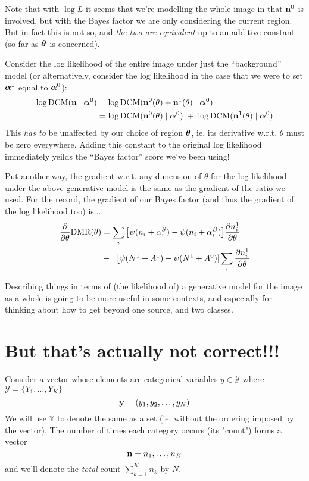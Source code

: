 \documentclass[12pt]{article}
\begin{document}
Note that with $\log L$ it seems that we're modelling the whole image
in that $\mathbf{n}^0$ is involved, but with the Bayes factor we are only
considering the current region. But in fact this is not so, and {\it
  the two are equivalent} up to an additive constant (so far as
$\boldsymbol\theta$ is concerned).

Consider the log likelihood of the entire image under just the
``background'' model (or alternatively, consider the log likelihood in the case that we were to set $\boldsymbol\alpha^1$ equal to $\boldsymbol\alpha^0$):
\begin{align*}
\log \mbox{DCM}(\mathbf{n} \mid \boldsymbol\alpha^0) 
&= \log \mbox{DCM}(\mathbf{n}^0(\theta) + \mathbf{n}^1(\theta) \mid \boldsymbol\alpha^0)  \\
&= \log \mbox{DCM}(\mathbf{n}^0(\theta) \mid \boldsymbol\alpha^0) \; + \; \log \mbox{DCM}(\mathbf{n}^1(\theta) \mid \boldsymbol\alpha^0) 
\end{align*}
This \emph{has to} be unaffected by our choice of region $\boldsymbol\theta$,
ie. its derivative w.r.t. $\theta$ must be zero everywhere.  Adding
this constant to the original log likelihood immediately yeilds the
``Bayes factor'' score we've been using!

Put another way, the gradient w.r.t. any dimension of $\theta$ for the
log likelihood under the above generative model is the same as the
gradient of the ratio we used.  For the record, the gradient of our
Bayes factor (and thus the gradient of the log likelihood too) is...
\begin{align}
\frac{\partial}{\partial\theta}\text{DMR}(\theta) 
&= \sum_i \big[ \psi(n_i + \alpha^S_i) - \psi(n_i + \alpha^B_i) \big] \frac{\partial n^1_i}{\partial\theta} \notag\\
& - \;\; \big[\psi(N^1+A^1) - \psi(N^1+A^0)]\sum_i \frac{\partial n^1_i}{\partial\theta}
\end{align}


Describing things in terms of (the likelihood of) a generative model
for the image as a whole is going to be more useful in some contexts,
and especially for thinking about how to get beyond one source, and
two classes.

\section{But that's actually not correct!!!}

Consider a vector whose elements are categorical variables $y \in \mathcal{Y} $ where $\mathcal{Y} = \{Y_1,\ldots,Y_K \}$
\[
\mathbf{y} = (y_1,y_2, \ldots, y_N) \]
We will use $\mathbb{Y}$ to denote the same as a set (ie. without the ordering imposed by the vector). The number of times each category occurs (its "count") forms a vector
\[
\mathbf{n} = n_1,\ldots,n_K  
\] 
and we'll denote the {\it total} count $\sum_{k=1}^K n_k$ by $N$.
\end{document}
